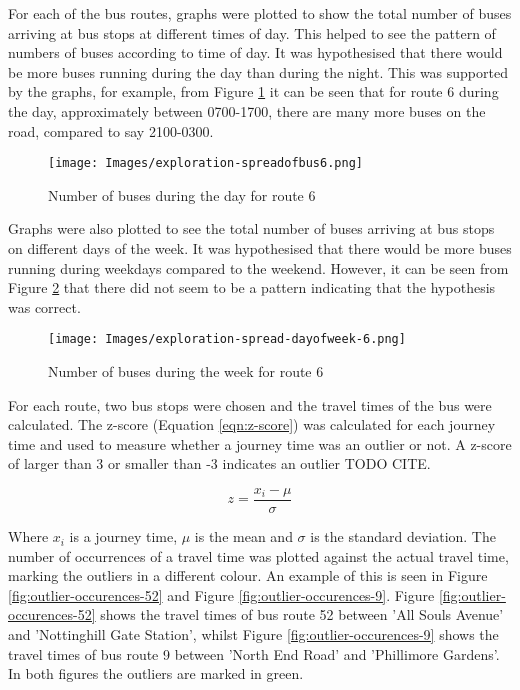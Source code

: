 For each of the bus routes, graphs were plotted to show the total number of buses arriving at bus stops at different times of day. This helped to see the pattern of numbers of buses according to time of day. It was hypothesised that there would be more buses running during the day than during the night. This was supported by the graphs, for example, from Figure \ref{fig:spread-of-buses-over-day-6} it can be seen that for route 6 during the day, approximately between 0700-1700, there are many more buses on the road, compared to say 2100-0300. 

\begin{figure}[H]
\begin{center}
    \texttt{[image: Images/exploration-spreadofbus6.png]}
    \caption{Number of buses during the day for route 6}
    \label{fig:spread-of-buses-over-day-6}
\end{center}
\end{figure}

Graphs were also plotted to see the total number of buses arriving at bus stops on different days of the week. It was hypothesised that there would be more buses running during weekdays compared to the weekend. However, it can be seen from Figure \ref{fig:spread-of-buses-over-week-6} that there did not seem to be a pattern indicating that the hypothesis was correct.

\begin{figure}[H]
\begin{center}
    \texttt{[image: Images/exploration-spread-dayofweek-6.png]}
    \caption{Number of buses during the week for route 6}
    \label{fig:spread-of-buses-over-week-6}
\end{center}
\end{figure}

For each route, two bus stops were chosen and the travel times of the bus were calculated. The z-score (Equation \ref{eqn:z-score}) was calculated for each journey time and used to measure whether a journey time was an outlier or not. A z-score of larger than 3 or smaller than -3 indicates an outlier TODO CITE. 

\begin{equation}
    z = \frac{x_i - \mu}{\sigma}
    \label{eqn:z-score}
\end{equation}

\noindent Where $x_i$ is a journey time, $\mu$ is the mean and $\sigma$ is the standard deviation. The number of occurrences of a travel time was plotted against the actual travel time, marking the outliers in a different colour. An example of this is seen in Figure \ref{fig:outlier-occurences-52} and Figure \ref{fig:outlier-occurences-9}. Figure \ref{fig:outlier-occurences-52} shows the travel times of bus route 52 between 'All Souls Avenue' and 'Nottinghill Gate Station', whilst Figure \ref{fig:outlier-occurences-9} shows the travel times of bus route 9 between 'North End Road' and 'Phillimore Gardens'. In both figures the outliers are marked in green.


